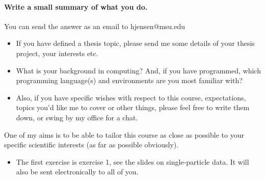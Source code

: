 \documentclass[%
twoside,                 %
final,                   %
10pt]{article}
\begin{document}
\paragraph{Write a small summary of what you do.}
You can send the answer as an email to hjensen@msu.edu
\begin{itemize}
\item If you have defined a thesis topic, please send me some details of your thesis project, your interests etc.

\item What is your background in computing? And, if you have programmed, which programming language(s) and environments  are you  most familiar with?  

\item Also, if you have specific wishes with respect to this course, expectations, topics you'd like me to cover or other things, please feel free to write them down, or swing by my office for a chat. 
\end{itemize}

\noindent
One of my aims is to be able to tailor this course as close as possible to your specific scientific interests (as far as possible obviously).

\begin{itemize}
\item The first exercise is exercise 1, see the slides on single-particle data.  It will also be sent electronically to all of you.
\end{itemize}

\noindent






\printindex
\end{document}
